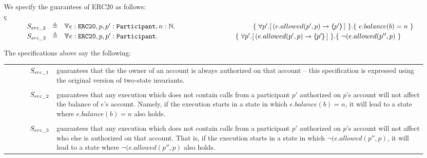 
We specify the guarantees of   ERC20  as follows:
\\
ç
\\
$\strut \SPSP  S_{erc\_2}\ \  \triangleq \ \ \TwoStatesLB{ e:\prg{ERC20},p,p':\prg{Participant},n:\mathbb{N}} 
 {\ \forall p'.[\,(e.allowed(p',p) \rightarrow   \inside{p'}\, ] \ } { \ e.balance(b)=n \ } $ 
\\
$\strut \SPSP  S_{erc\_3}\ \  \triangleq \ \ \TwoStatesLB{ e:\prg{ERC20},p,p':\prg{Participant}}  {\ \forall p'.[\,(e.allowed(p',p) \rightarrow   \inside{p'}\, ] \ } { \ \neg (e.allowed(p'',p) \ } $ 

The specifications above say the following:
\\
\begin{tabular}{ll}
\begin{minipage}{.10\textwidth}
$\strut \ \ \ \ \ \ \ \ \ \   S_{erc\_1}$
\end{minipage}
&
\begin{minipage}{.85\textwidth}
guarantees that the the owner of an account is always authorized on that account -- this specification is expressed using the original version of two-state invariants.
\end{minipage}
\\
\\
\begin{minipage}{.10\textwidth}
$\strut \ \ \ \ \ \ \ \ \ \   S_{erc\_2}$ 
\end{minipage}
&
\begin{minipage}{.85\textwidth}
guarantees that any execution which does not contain calls from a participant $p'$ authorized on $p$'s account will not affect the balance of $e$'s account. Namely, if the execution starts in a state in which $ e.balance(b)=n$, it will lead to a state where $ e.balance(b)=n$ also holds.
\end{minipage}
\\
\\
\begin{minipage}{.10\textwidth}
$\strut \ \ \ \ \ \ \ \ \ \   S_{erc\_3}$ 
\end{minipage}
&
\begin{minipage}{.85\textwidth}
guarantees that any execution which does not contain calls from a participant $p'$ authorized on $p$'s account will not affect who else is authorized on that account. That is, if the execution starts in a state in which $ \neg (e.allowed(p'',p)$, it will lead to a state where $ \neg (e.allowed(p'',p)$ also holds.
\end{minipage}
\end{tabular}

